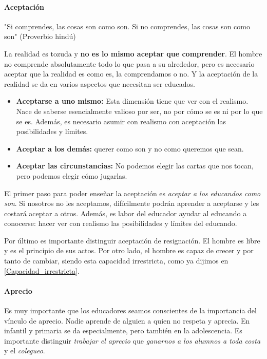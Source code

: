 \documentclass[palatino]{apuntesURJC}
\begin{document}
	\paragraph{Aceptación}

	"Si comprendes, las cosas son como son. Si no comprendes, las cosas son como son" (Proverbio hindú)

	La realidad es tozuda y \textbf{no es lo mismo aceptar que comprender}. 
	El hombre no comprende absolutamente todo lo que pasa a su alrededor, pero es necesario aceptar que la realidad es como es, la comprendamos o no.
	Y la aceptación de la realidad se da en varios aspectos que necesitan ser educados.

	\begin{itemize}
		\item \textbf{Aceptarse a uno mismo:} Esta dimensión tiene que ver con el realismo. 
		Nace de saberse esencialmente valioso por ser, no por cómo se es ni por lo que se es.
		Además, es necesario asumir con realismo con aceptación las posibilidades y límites.

		\item \textbf{Aceptar a los demás:} querer como son y no como queremos que sean.

		\item \textbf{Aceptar las circunstancias:} No podemos elegir las cartas que nos tocan, pero podemos elegir cómo jugarlas.
	\end{itemize}

	El primer paso para poder enseñar la aceptación es \textit{aceptar a los educandos como son}.
	Si nosotros no les aceptamos, difícilmente podrán aprender a aceptarse y les costará aceptar a otros.
	Además, es labor del educador ayudar al educando a conocerse: hacer ver con realismo las posibilidades y límites del educando. 

	Por último es importante distinguir aceptación de resignación. El hombre es libre y es el principio de sus actos.
	Por otro lado, el hombre es capaz de crecer y por tanto de cambiar, siendo esta capacidad irrestricta, como ya dijimos en \ref{Capacidad_irrestricta}.
	


	\paragraph{Aprecio}

Es muy importante que los educadores seamos conscientes de la importancia del vínculo de aprecio. 
%
Nadie aprende de alguien a quien no respeta y aprecia. 
%
En infantil y primaria se da especialmente, pero también en la adolescencia.
%
Es importante distinguir \textit{trabajar el aprecio} que \textit{ganarnos a los alumnos a toda costa} y el \textit{colegueo}.
\end{document}
